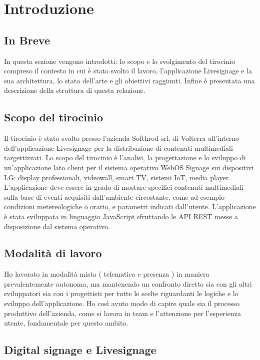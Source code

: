 \chapter{Introduzione} 
\linespread{1.5}

\section{In Breve}
In questa sezione vengono introdotti: lo scopo e lo svolgimento del tirocinio compreso il contesto in cui è stato svolto il lavoro, l'applicazione Livesignage e la sua architettura, lo stato dell'arte e gli obiettivi raggiunti. Infine è presentata una descrizione della struttura di questa relazione.

\section{Scopo del tirocinio}

Il tirocinio è stato svolto presso l'azienda Softhrod srl. di Volterra all'interno dell'applicazione Livesignage per la distribuzione di contenuti multimediali targettizzati. Lo scopo del tirocinio è l'analisi, la progettazione e lo sviluppo di un'applicazione lato client per il sistema operativo WebOS Signage sui dispositivi LG:  display professionali, videowall, smart TV, sistemi IoT, media player. L'applicazione deve essere in grado di mostare specifici contenuti multimediali sulla base di eventi acquisiti dall'ambiente circostante, come ad esempio condizioni metereologiche o orario, e parametri indicati dall'utente. L'applicazione è stata sviluppata in linguaggio JavaScript sfruttando le API REST messe a disposizione dal sistema operativo.

\section{Modalità di lavoro}

Ho lavorato in modalità mista ( telematica e presenza ) in maniera prevalentemente autonoma, ma mantenendo un confronto diretto sia con gli altri sviluppatori sia con i progettisti per tutte le scelte riguardanti le logiche e lo sviluppo dell'applicazione. Ho così avuto modo di capire quale sia il processo produttivo dell'azienda, come si lavora in team e l'attenzione per l'esperienza utente, fondamentale per questo ambito.

\section{Digital signage e Livesignage}

